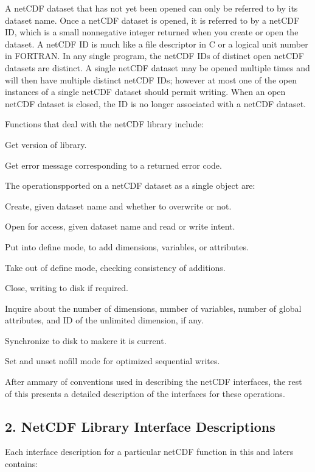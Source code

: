 A net\+C\+DF dataset that has not yet been opened can only be referred to by its dataset name. Once a net\+C\+DF dataset is opened, it is referred to by a net\+C\+DF ID, which is a small nonnegative integer returned when you create or open the dataset. A net\+C\+DF ID is much like a file descriptor in C or a logical unit number in F\+O\+R\+T\+R\+AN. In any single program, the net\+C\+DF I\+Ds of distinct open net\+C\+DF datasets are distinct. A single net\+C\+DF dataset may be opened multiple times and will then have multiple distinct net\+C\+DF I\+Ds; however at most one of the open instances of a single net\+C\+DF dataset should permit writing. When an open net\+C\+DF dataset is closed, the ID is no longer associated with a net\+C\+DF dataset.

Functions that deal with the net\+C\+DF library include\+:


\begin{DoxyItemize}
\item Get version of library.
\item Get error message corresponding to a returned error code.
\end{DoxyItemize}

The operationspported on a net\+C\+DF dataset as a single object are\+:


\begin{DoxyItemize}
\item Create, given dataset name and whether to overwrite or not.
\item Open for access, given dataset name and read or write intent.
\item Put into define mode, to add dimensions, variables, or attributes.
\item Take out of define mode, checking consistency of additions.
\item Close, writing to disk if required.
\item Inquire about the number of dimensions, number of variables, number of global attributes, and ID of the unlimited dimension, if any.
\item Synchronize to disk to makere it is current.
\item Set and unset nofill mode for optimized sequential writes.
\item After ammary of conventions used in describing the net\+C\+DF interfaces, the rest of this presents a detailed description of the interfaces for these operations.
\end{DoxyItemize}\hypertarget{nc_f77_interface_guide_f77_NetCDF_Library_Interface_Descriptions}{}\subsection{2. Net\+C\+D\+F Library Interface Descriptions }\label{nc_f77_interface_guide_f77_NetCDF_Library_Interface_Descriptions}
Each interface description for a particular net\+C\+DF function in this and laters contains\+:


